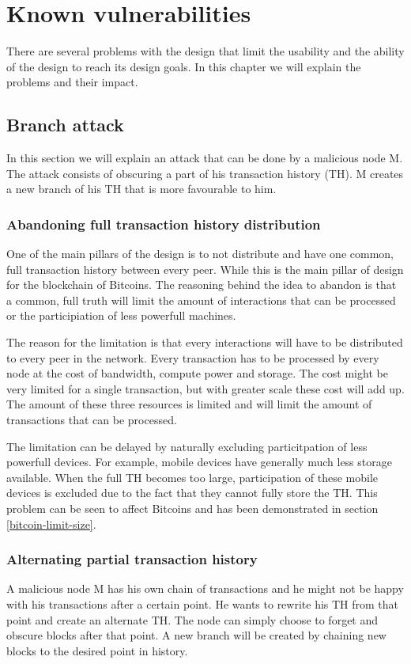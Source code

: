 \chapter{Known vulnerabilities}
There are several problems with the design that limit the usability
and the ability of the design to reach its design goals.
In this chapter we will explain the problems and their impact.

\section{Branch attack}
In this section we will explain an attack that can be done by a malicious node M.
The attack consists of obscuring a part of his transaction history (TH).
M creates a new branch of his TH that is more favourable to him.

\subsection{Abandoning full transaction history distribution}
One of the main pillars of the design is to not distribute
and have one common, full transaction history between every peer.
While this is the main pillar of design for the blockchain of Bitcoins.
The reasoning behind the idea to abandon is that a common, full truth
will limit the amount of interactions that can be processed
or the participiation of less powerfull machines.

The reason for the limitation is that every interactions will have to be distributed to every peer in the network.
Every transaction has to be processed by every node at the cost of bandwidth, compute power and storage.
The cost might be very limited for a single transaction,
but with greater scale these cost will add up.
The amount of these three resources is limited and will limit the amount of transactions that can be processed.

The limitation can be delayed by naturally excluding particitpation of less powerfull devices.
For example, mobile devices have generally much less storage available.
When the full TH becomes too large,
participation of these mobile devices is excluded due to the fact that they cannot fully store the TH.
This problem can be seen to affect Bitcoins and has been demonstrated in section \ref{bitcoin-limit-size}.

\subsection{Alternating partial transaction history}
A malicious node M has his own chain of transactions
and he might not be happy with his transactions after a certain point.
He wants to rewrite his TH from that point and create an alternate TH.
The node can simply choose to forget and obscure blocks after that point.
A new branch will be created by chaining new blocks to the desired point in history.

